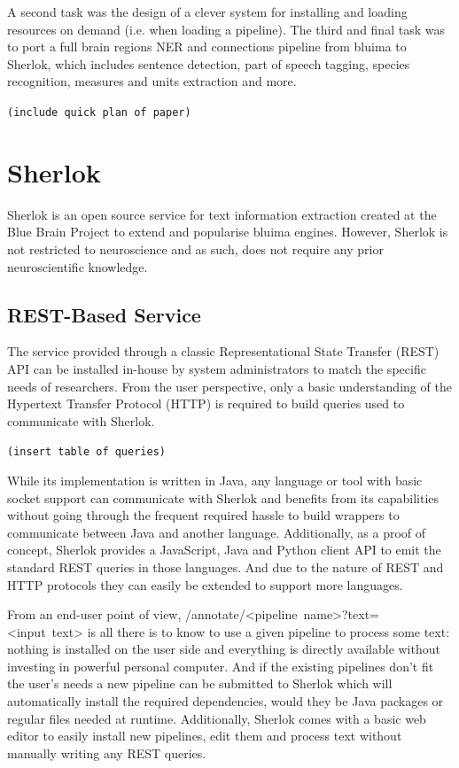\documentclass{article}
\newcommand{\TODO}[1]{\texttt{\textcolor{YellowOrange}{(#1)}}} %
\newcommand{\REST}[1]{\textsf{#1}}
\begin{document}
A second task was the design of a clever system for installing and loading resources on demand (i.e.
when loading a pipeline). The third and final task was to port a full brain regions NER and
connections pipeline from bluima to Sherlok, which includes sentence detection, part of speech
tagging, species recognition, measures and units extraction and more.

\TODO{include quick plan of paper}

\section{Sherlok}

Sherlok is an open source service for text information extraction created at the Blue Brain Project
to extend and popularise bluima engines. However, Sherlok is not restricted to neuroscience and as
such, does not require any prior neuroscientific knowledge.

\subsection{REST-Based Service}

The service provided through a classic Representational State Transfer (REST) API can be installed
in-house by system administrators to match the specific needs of researchers. From the user
perspective, only a basic understanding of the Hypertext Transfer Protocol (HTTP) is required to
build queries used to communicate with Sherlok.

\TODO{insert table of queries}

While its implementation is written in Java, any language or tool with basic socket support can
communicate with Sherlok and benefits from its capabilities without going through the frequent
required hassle to build wrappers to communicate between Java and another language. Additionally,
as a proof of concept, Sherlok provides a JavaScript, Java and Python client API to emit the
standard REST queries in those languages. And due to the nature of REST and HTTP protocols they can
easily be extended to support more languages.

From an end-user point of view, \REST{/annotate/<pipeline~name>?text=<input~text>} is all there is to
know to use a given pipeline to process some text: nothing is installed on the user side and
everything is directly available without investing in powerful personal computer. And if the
existing pipelines don't fit the user's needs a new pipeline can be submitted to Sherlok which will
automatically install the required dependencies, would they be Java packages or regular files needed
at runtime. Additionally, Sherlok comes with a basic web editor to easily install new pipelines, edit them
and process text without manually writing any REST queries.
\end{document}
